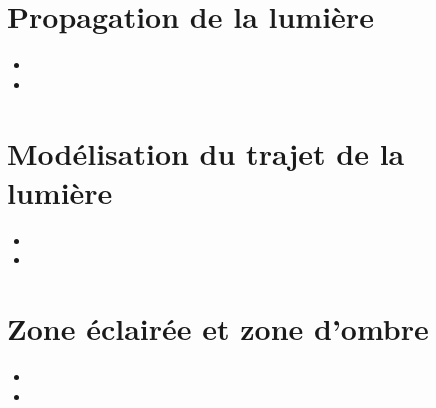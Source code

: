 \documentclass[12pt,a4paper]{article}
\date{}
\title{}
\begin{document}
	
	

\section{Propagation de la lumière}








\begin{myexos}
	\begin{itemize}
		\item {}
		\item {}
	\end{itemize}
\end{myexos}

\section{Modélisation du trajet de la lumière}





\begin{myexos}
	\begin{multicols}{2}
	
		\begin{itemize}
			\item {}
			\item {}
			
		\end{itemize}
	
	\end{multicols}
\end{myexos}


\section{Zone éclairée et zone d'ombre}





\begin{myexos}
	\begin{itemize}
		\item {}
		\item {}
	\end{itemize}
\end{myexos}
\end{document}
